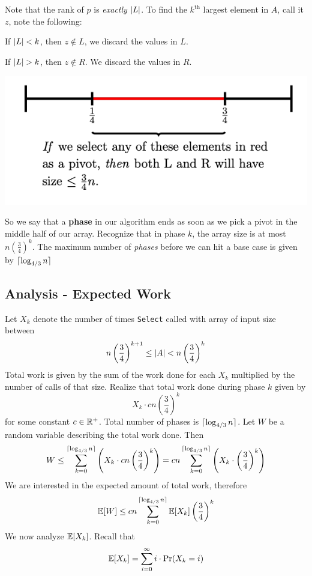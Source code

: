 \documentclass[11pt]{article}
\begin{document}
Note that the rank of \(p\) is \emph{exactly} \(\abs{L}\). To find the \(k^{\text{th}}\) largest
element in \(A\), call it \(z\), note the following:
\begin{center}
If \(\abs{L}<k\), then \(z\notin L\), we discard the values in \(L\).

If \(\abs{L}>k\), then \(z\notin R\). We discard the values in \(R\).
\end{center}

\begin{center}
\includegraphics[width=.7\textwidth]{../images/cme323/2.png}
\label{}
\end{center}

So we say that a \textbf{phase} in our algorithm ends as soon as we pick a pivot in the middle half of
our array. Recognize that in phase \(k\), the array size is at
most \(n\left( \frac{3}{4} \right)^k\). The maximum number of \emph{phases} before we can hit a base
case is given by \(\lceil \log_{4/3}n \rceil\)
\subsection{Analysis - Expected Work}
\label{sec:org50b1f9b}
Let \(X_k\) denote the number of times \texttt{Select} called with array of input size between
\begin{equation*}
n\left( \frac{3}{4} \right)^{k+1}\le\abs{A}<n\left( \frac{3}{4} \right)^k
\end{equation*}
Total work is given by the sum of the work done for each \(X_k\) multiplied by the number of
calls of that size. Realize that total work done during phase \(k\) given by
\begin{equation*}
X_k\cdot cn\left( \frac{3}{4} \right)^k
\end{equation*}
for some constant \(c\in\mathbb{R}^+\). Total number of phases is \(\lceil \log_{4/3}n \rceil\). Let \(W\) be a
random variable describing the total work done. Then
\begin{equation*}
W\le\sum_{k=0}^{\lceil \log_{4/3}n \rceil}\left( X_k\cdot cn\left( \frac{3}{4} \right)^k \right)=
cn\sum_{k=0}^{\lceil \log_{4/3}n \rceil}\left( X_k\cdot\left( \frac{3}{4} \right)^k \right)
\end{equation*}
We are interested in the expected amount of total work, therefore
\begin{equation*}
\mathbb{E}[W]\le cn\sum_{k=0}^{\lceil \log_{4/3}n \rceil}\mathbb{E}[X_k]\left( \frac{3}{4} \right)^k
\end{equation*}
We now analyze \(\mathbb{E}[X_k]\). Recall that
\begin{equation*}
\mathbb{E}[X_k]=\sum_{i=0}^\infty i\cdot\Pr(X_k=i)
\end{equation*}
\end{document}

